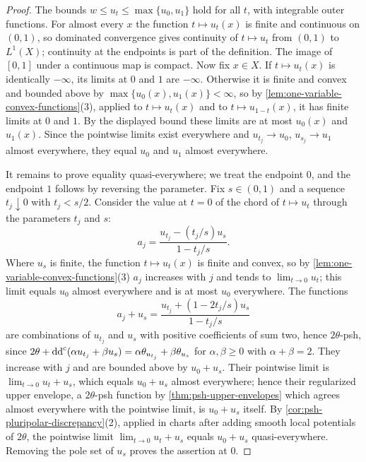\begin{proof}
The bounds $w\leq u_t\leq\max\{u_0,u_1\}$ hold for all $t$, with integrable outer functions. For almost every $x$ the function $t\mapsto u_t(x)$ is finite and continuous on $(0,1)$, so dominated convergence gives continuity of $t\mapsto u_t$ from $(0,1)$ to $L^1(X)$; continuity at the endpoints is part of the definition. The image of $[0,1]$ under a continuous map is compact. Now fix $x\in X$. If $t\mapsto u_t(x)$ is identically $-\infty$, its limits at $0$ and $1$ are $-\infty$. Otherwise it is finite and convex and bounded above by $\max\{u_0(x),u_1(x)\}<\infty$, so by \cref{lem:one-variable-convex-functions}(3), applied to $t\mapsto u_t(x)$ and to $t\mapsto u_{1-t}(x)$, it has finite limits at $0$ and $1$. By the displayed bound these limits are at most $u_0(x)$ and $u_1(x)$. Since the pointwise limits exist everywhere and $u_{t_j}\to u_0$, $u_{s_j}\to u_1$ almost everywhere, they equal $u_0$ and $u_1$ almost everywhere.

It remains to prove equality quasi-everywhere; we treat the endpoint $0$, and the endpoint $1$ follows by reversing the parameter. Fix $s\in(0,1)$ and a sequence $t_j\downarrow0$ with $t_j<s/2$. Consider the value at $t=0$ of the chord of $t\mapsto u_t$ through the parameters $t_j$ and $s$:
\[
 a_j=\frac{u_{t_j}-(t_j/s)u_s}{1-t_j/s}.
\]
Where $u_s$ is finite, the function $t\mapsto u_t(x)$ is finite and convex, so by \cref{lem:one-variable-convex-functions}(3) $a_j$ increases with $j$ and tends to $\lim_{t\to0}u_t$; this limit equals $u_0$ almost everywhere and is at most $u_0$ everywhere. The functions
\[
 a_j+u_s=\frac{u_{t_j}+(1-2t_j/s)u_s}{1-t_j/s}
\]
are combinations of $u_{t_j}$ and $u_s$ with positive coefficients of sum two, hence $2\theta$-psh, since $2\theta+\mathrm{dd}^{\mathrm{c}}(\alpha u_{t_j}+\beta u_s)=\alpha\theta_{u_{t_j}}+\beta\theta_{u_s}$ for $\alpha,\beta\geq0$ with $\alpha+\beta=2$. They increase with $j$ and are bounded above by $u_0+u_s$. Their pointwise limit is $\lim_{t\to0}u_t+u_s$, which equals $u_0+u_s$ almost everywhere; hence their regularized upper envelope, a $2\theta$-psh function by \cref{thm:psh-upper-envelopes} which agrees almost everywhere with the pointwise limit, is $u_0+u_s$ itself. By \cref{cor:psh-pluripolar-discrepancy}(2), applied in charts after adding smooth local potentials of $2\theta$, the pointwise limit $\lim_{t\to0}u_t+u_s$ equals $u_0+u_s$ quasi-everywhere. Removing the pole set of $u_s$ proves the assertion at $0$.
\end{proof}

